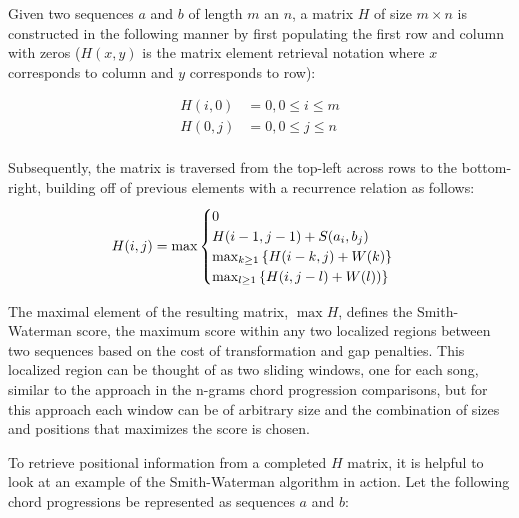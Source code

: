 



Given two sequences $a$ and $b$ of length $m$ an $n$, a matrix $H$ of size $m \times n$ is constructed in the following manner by first populating the first row and column with zeros ($H(x,y)$ is the matrix element retrieval notation where $x$ corresponds to column and $y$ corresponds to row):

\begin{align*}
H(i,0) &= 0, 0 \leq i \leq m \\
H(0,j) &= 0, 0 \leq j \leq n \\
\end{align*}

Subsequently, the matrix is traversed from the top-left across rows to the bottom-right, building off of previous elements with a recurrence relation as follows:
\[ H(i,j) = \hbox{max} \begin{cases} 0 \\ H(i-1,j-1)+S(a_i,b_j) \\ \hbox{max}_{k \geq 1} \left\{ H(i-k,j)+W(k) \right\} \\ \hbox{max}_{l \geq 1}\left\{ H(i, j-l)+W(l)) \right\} \end{cases}  \]

The maximal element of the resulting matrix, $\max H$, defines the Smith-Waterman score, the maximum score within any two localized regions between two sequences based on the cost of transformation and gap penalties. This localized region can be thought of as two sliding windows, one for each song, similar to the approach in the n-grams chord progression comparisons, but for this approach each window can be of arbitrary size and the combination of sizes and positions that maximizes the score is chosen.

To retrieve positional information from a completed $H$ matrix, it is helpful to look at an example of the Smith-Waterman algorithm in action. Let the following chord progressions be represented as sequences $a$ and $b$:

